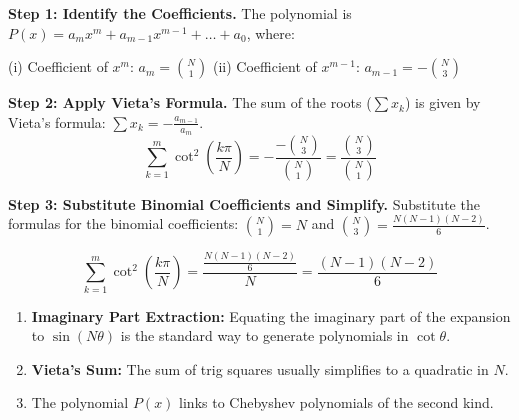 \begin{solution}
\textbf{Step 1: Identify the Coefficients.}
The polynomial is $P(x) = a_m x^m + a_{m-1} x^{m-1} + \dots + a_0$, where:

(i) Coefficient of $x^m$: $a_m = \binom{N}{1}$
(ii) Coefficient of $x^{m-1}$: $a_{m-1} = -\binom{N}{3}$

\textbf{Step 2: Apply Vieta's Formula.}
The sum of the roots ($\sum x_k$) is given by Vieta's formula: $\sum x_k = -\frac{a_{m-1}}{a_m}$.
\[ \sum_{k=1}^m \cot^2\left(\frac{k\pi}{N}\right) = - \frac{-\binom{N}{3}}{\binom{N}{1}} = \frac{\binom{N}{3}}{\binom{N}{1}} \]

\textbf{Step 3: Substitute Binomial Coefficients and Simplify.}
Substitute the formulas for the binomial coefficients: $\binom{N}{1} = N$ and $\binom{N}{3} = \frac{N(N-1)(N-2)}{6}$.

\[ \sum_{k=1}^m \cot^2\left(\frac{k\pi}{N}\right) = \frac{\frac{N(N-1)(N-2)}{6}}{N} = \frac{(N-1)(N-2)}{6} \]

\end{solution}


\begin{takeaways}
\begin{enumerate}
    \item \textbf{Imaginary Part Extraction:} 
    Equating the imaginary part of the expansion to $\sin(N\theta)$ 
    is the standard way to generate polynomials in $\cot \theta$.
    \item \textbf{Vieta's Sum:} 
    The sum of trig squares usually simplifies to a quadratic in $N$.
    \item The polynomial $P(x)$ links to Chebyshev polynomials of the second kind.

\end{enumerate}
\end{takeaways}

